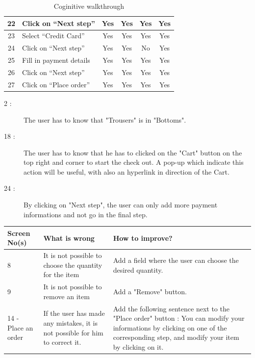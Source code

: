\begin{table}[htdp]
\begin{center}
\begin{tabular}{|c|l|c|c|c|c|}
\hline
22 & Click on ``Next step'' & Yes & Yes & Yes & Yes\\
\hline
23 & Select ``Credit Card'' & Yes & Yes & Yes & Yes\\
\hline
24 & Click on ``Next step'' & Yes & Yes & No & Yes\\
\hline
25 & Fill in payment details & Yes & Yes & Yes & Yes\\
\hline
26 & Click on ``Next step'' & Yes & Yes & Yes & Yes\\
\hline
27 & Click on ``Place order'' & Yes & Yes & Yes & Yes\\
\hline
\end{tabular}
\end{center}
\label{Coginitive_walkthrough}
\caption{Coginitive walkthrough}
\end{table}%

\begin{description}
\item[2 :] The user has to know that "Trousers" is in "Bottoms". 
\item[18 :] The user has to know that he has to clicked on the "Cart" button on the top right and corner to start the check out. A pop-up which indicate this action will be useful, with also an hyperlink in direction of the Cart.
\item[24 :] By clicking on "Next step", the user can only add more payment informations and not go in the final step.
\end{description}

\begin{large}
\end{large}



\begin{table}[htdp]
\begin{center}
\begin{tabular}{|p{2cm}|p{6.5cm}|p{6.5cm}|}
\hline
\textbf{Screen No(s)} & \textbf{What is wrong} & \textbf{How to improve?} \\
\hline
8 & It is not possible to choose the quantity for the item & Add a field where the user can choose the desired quantity.\\
\hline
9 & It is not possible to remove an item & Add a "Remove" button.\\
\hline
14 - Place an order & If the user has made any mistakes, it is not possible for him to correct it. & Add the following sentence next to the "Place order" button : You can modify your informations by clicking on one of the corresponding step, and modify your item by clicking on it.\\
\hline
\end{tabular}
\end{center}
\label{3_heurisitcs_eval}
\end{table}

